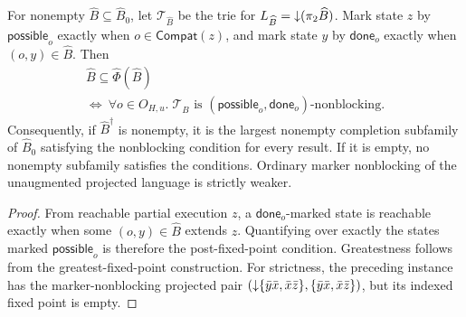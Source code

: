 \begin{proposition}
\label{prop:result-necessary}
For nonempty \(\widehat B\subseteq\widehat B_0\), let \(\mathcal T_{\widehat B}\) be the trie for \(L_{\widehat B}=\mathord{\downarrow}(\pi_2\widehat B)\).
Mark state \(z\) by \(\mathsf{possible}_o\) exactly when \(o\in\mathsf{Compat}(z)\), and mark state \(y\) by \(\mathsf{done}_o\) exactly when \((o,y)\in\widehat B\).
Then
\[
\begin{gathered}
 \widehat B\subseteq\widehat\Phi(\widehat B)\\[-2pt]
 \Longleftrightarrow\
 \forall o\in O_{H,u}.\;
 \mathcal T_{\widehat B}\text{ is }
 (\mathsf{possible}_o,\mathsf{done}_o)\text{-nonblocking}.
\end{gathered}
\]
Consequently, if \(\widehat B^\dagger\) is nonempty, it is the largest nonempty completion subfamily of \(\widehat B_0\) satisfying the nonblocking condition for every result.
If it is empty, no nonempty subfamily satisfies the conditions.
Ordinary marker nonblocking of the unaugmented projected language is strictly weaker.
\end{proposition}
\begin{proof}
From reachable partial execution \(z\), a \(\mathsf{done}_o\)-marked state is reachable exactly when some \((o,y)\in\widehat B\) extends \(z\).
Quantifying over exactly the states marked \(\mathsf{possible}_o\) is therefore the post-fixed-point condition.
Greatestness follows from the greatest-fixed-point construction.
For strictness, the preceding instance has the marker-nonblocking projected pair \((\mathord{\downarrow}\{\bar y\bar x,\bar x\bar z\}, \{\bar y\bar x,\bar x\bar z\})\), but its indexed fixed point is empty.
\end{proof}

